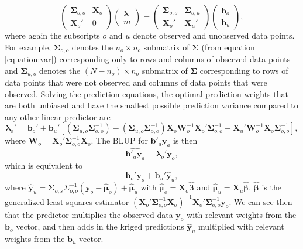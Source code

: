 \documentclass[]{article}    %
\begin{document}
\begin{equation}
\begin{pmatrix}
\bm{\Sigma}_{o, o} & \mathbf{X}_o \\
\mathbf{X}_o' & 0
\end{pmatrix} 
\begin{pmatrix}
\bm{\lambda} \\
m
\end{pmatrix} = 
\begin{pmatrix}
\bm{\Sigma}_{o, o} & \bm{\Sigma}_{o, u} \\
\mathbf{X}_{o}' & \mathbf{X}_{u}'
\end{pmatrix} 
\begin{pmatrix}
\mathbf{b}_{o} \\
\mathbf{b}_{u}
\end{pmatrix},
\end{equation} \noindent where again the subscripts \(o\) and \(u\)
denote observed and unobserved data points. For example,
\(\bm{\Sigma}_{o, o}\) denotes the \(n_o \times n_o\) submatrix of
\(\bm{\Sigma}\) (from equation \ref{equation:var}) corresponding only to
rows and columns of observed data points and \(\bm{\Sigma}_{u, o}\)
denotes the \((N - n_o) \times n_o\) submatrix of \(\bm{\Sigma}\)
corresponding to rows of data points that were not observed and columns
of data points that were observed. Solving the prediction equations, the
optimal prediction weights that are both unbiased and have the smallest
possible prediction variance compared to any other linear predictor are
\mbox{} \begin{equation}
\bm{\lambda}_o' = \mathbf{b}_{o}' + \mathbf{b}_{u}'\left[ (\bm{\Sigma}_{u, o}\bm{\Sigma}_{o, o}^{-1}) - (\bm{\Sigma}_{u, o} \bm{\Sigma}_{o, o}^{-1})\mathbf{X}_o\mathbf{W}_o^{-1}\mathbf{X}_o'\bm{\Sigma}_{o, o}^{-1} + \mathbf{X}_{u}'\mathbf{W}_o^{-1}\mathbf{X}_o \bm{\Sigma}_{o, o}^{-1} \right],
\end{equation} \noindent where
\(\mathbf{W}_o = \mathbf{X}_o'\bm{\Sigma}_{o, o}^{-1}\mathbf{X}_o\). The
BLUP for \(\mathbf{b}'_a \mathbf{y}_a\) is then \mbox{}
\begin{equation} \label{equation:blup}
\widehat{\mathbf{b}'_a \mathbf{y}_a} = \bm{\lambda}_o' \mathbf{y}_o,
\end{equation} \noindent which is equivalent to \mbox{}
\begin{equation*}
\mathbf{b}_{o}'\mathbf{y}_{o} + \mathbf{b}_{u}' \mathbf{\hat{y}}_{u},
\end{equation*} \noindent where
\(\mathbf{\hat{y}}_{u} = \bm{\Sigma}_{o, s} \Sigma_{o, o}^{-1} (\mathbf{y}_o - \bm{\hat{\mu}}_o) + \bm{\hat{\mu}}_u\)
with \(\bm{\hat{\mu}}_o = \mathbf{X}_o \bm{\hat{\beta}}\) and
\(\bm{\hat{\mu}}_u = \mathbf{X}_u \bm{\hat{\beta}}\).
\(\bm{\hat{\beta}}\) is the generalized least squares estimator
\((\mathbf{X}_o' \bm{\Sigma}_{o, o}^{-1} \mathbf{X}_o)^{-1} \mathbf{X}_o' \bm{\Sigma}_{o, o}^{-1} \mathbf{y}_o\).
We can see then that the predictor multiplies the observed data
\(\mathbf{y}_o\) with relevant weights from the \(\mathbf{b}_o\) vector,
and then adds in the kriged predictions \(\mathbf{\hat{y}}_{u}\)
multiplied with relevant weights from the \(\mathbf{b}_u\) vector.
\end{document}

